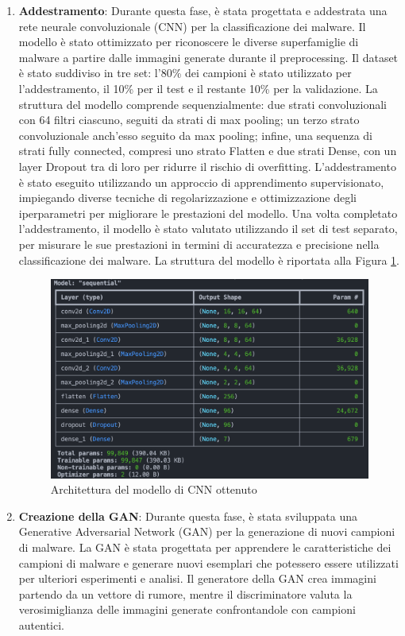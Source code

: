 \begin{enumerate}
    \item \textbf{Addestramento}: Durante questa fase, è stata progettata e addestrata una rete neurale convoluzionale (CNN) per la classificazione dei malware. Il modello è stato ottimizzato per riconoscere le diverse superfamiglie di malware a partire dalle immagini generate durante il preprocessing. Il dataset è stato suddiviso in tre set: l'80\% dei campioni è stato utilizzato per l'addestramento, il 10\% per il test e il restante 10\% per la validazione. La struttura del modello comprende sequenzialmente: due strati convoluzionali con 64 filtri ciascuno, seguiti da strati di max pooling; un terzo strato convoluzionale anch'esso seguito da max pooling; infine, una sequenza di strati fully connected, compresi uno strato Flatten e due strati Dense, con un layer Dropout tra di loro per ridurre il rischio di overfitting. L'addestramento è stato eseguito utilizzando un approccio di apprendimento supervisionato, impiegando diverse tecniche di regolarizzazione e ottimizzazione degli iperparametri per migliorare le prestazioni del modello. Una volta completato l'addestramento, il modello è stato valutato utilizzando il set di test separato, per misurare le sue prestazioni in termini di accuratezza e precisione nella classificazione dei malware.
    La struttura del modello è riportata alla Figura \ref{fig:cnn_architecture}.
    \begin{figure}[h]
        \centering
        \includegraphics[width=0.8\linewidth]{images/cnn_architecture.png}
        \caption{Architettura del modello di CNN ottenuto} 
        \label{fig:cnn_architecture} 
    \end{figure}
    \newpage
    
    \item \textbf{Creazione della GAN}: Durante questa fase, è stata sviluppata una Generative Adversarial Network (GAN) per la generazione di nuovi campioni di malware. La GAN è stata progettata per apprendere le caratteristiche dei campioni di malware e generare nuovi esemplari che potessero essere utilizzati per ulteriori esperimenti e analisi. Il generatore della GAN crea immagini partendo da un vettore di rumore, mentre il discriminatore valuta la verosimiglianza delle immagini generate confrontandole con campioni autentici.


\end{enumerate}
